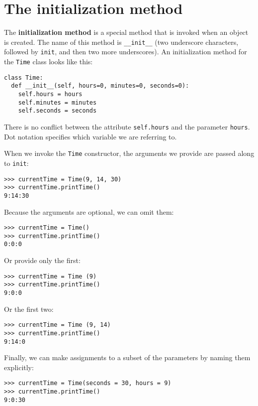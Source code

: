 \section{The initialization method}

The {\bf initialization method} is
a special method that is invoked when an object is created.  The name
of this method is {\tt \_\_init\_\_} (two underscore characters,
followed by {\tt init}, and then two more underscores).  An
initialization method for the {\tt Time} class looks like this:

\beforeverb
\begin{verbatim}
class Time:
  def __init__(self, hours=0, minutes=0, seconds=0):
    self.hours = hours
    self.minutes = minutes
    self.seconds = seconds
\end{verbatim}
\afterverb
%
There is no conflict between the attribute {\tt self.hours}
and the parameter {\tt hours}.  Dot notation specifies which
variable we are referring to.


When we invoke the {\tt Time} constructor, the arguments we provide
are passed along to {\tt init}:

\beforeverb
\begin{verbatim}
>>> currentTime = Time(9, 14, 30)
>>> currentTime.printTime()
9:14:30
\end{verbatim}
\afterverb
%
Because the arguments are optional, we can omit them:

\beforeverb
\begin{verbatim}
>>> currentTime = Time()
>>> currentTime.printTime()
0:0:0
\end{verbatim}
\afterverb
%
Or provide only the first:

\beforeverb
\begin{verbatim}
>>> currentTime = Time (9)
>>> currentTime.printTime()
9:0:0
\end{verbatim}
\afterverb
%
Or the first two:

\beforeverb
\begin{verbatim}
>>> currentTime = Time (9, 14)
>>> currentTime.printTime()
9:14:0
\end{verbatim}
\afterverb
%
Finally, we can make assignments to a subset of the
parameters by naming them explicitly:

\beforeverb
\begin{verbatim}
>>> currentTime = Time(seconds = 30, hours = 9)
>>> currentTime.printTime()
9:0:30
\end{verbatim}
\afterverb
%

